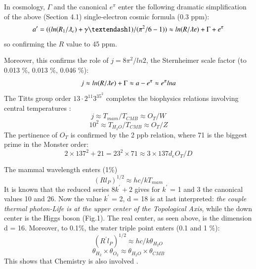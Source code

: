 \documentclass[twoside,draft]{article}
\begin{document}
\begin{sloppypar}
In cosmology, $\Gamma$ and the canonical $e^{\pi}$ enter the following dramatic simplification of the above (Section 4.1) single-electron cosmic formula (0.3 ppm):    
\begin{equation}
a^{\prime} = ((ln(R_1/\lambdabar_e) + \gamma – 1)/(\pi^2/6 - 1)) \approx ln(R/\lambdabar e) + \Gamma + e^{\pi}
\end{equation}
so confirming the $R$ value to 45 ppm.

Moreover, this confirms the role of $j = 8\pi^2/ln2$, the Sternheimer scale factor\cite{Sanchez1}  (to 0.013 \%, 0.013 \%, 0.046 \%):
\begin{equation}
j \approx ln(R/\lambdabar e) + \Gamma \approx a - e^{\pi} \approx e^{\pi} lna
\end{equation}
The Titts group order $13\cdot 2^{11}3^35^2$ \cite{Titts}  completes the biophysics relations involving central temperatures \cite{Sanchez1}: 
\begin{equation}
j\approx T_{mam}/T_{CMB} \approx O_T / W
\end{equation}
\begin{equation}
10^2\approx T_{H_2O}/T_{CMB} \approx O_T / Z
\end{equation}
The pertinence of $O_T$ is confirmed by the 2 ppb relation, where 71 is the biggest prime in the Monster order: 
\begin{equation}
2\times 137^2 + 21 = 23^2\times 71 \approx 3\times 137 d_e O_T/D    
\end{equation}


The mammal wavelength enters (1\%)
\begin{equation}
(Rl_P)^{1/2}\approx hc/kT_{mam}
\end{equation}
It is known that the reduced series $8k^{\prime}+2$ gives for $k^{\prime}$ = 1 and 3 the canonical values 10 and 26. Now the value $k^{\prime}$ = 2, d = 18 is at last interpreted: \textit{the couple thermal photon-Life is at the upper center of the Topological Axis}, while the down center is the Higgs boson (Fig.1). The real center, as seen above, is the dimension d = 16. Moreover, to 0.1\%, the water triple point enters (0.1 and 1 \%):
\begin{equation}
(R^{\prime}l_P)^{1/2}\approx hc/k\theta_{H_2O}
\end{equation}
\begin{equation}
\theta_{H_2}\times \theta_{O_2} \approx \theta_{H_2O} \times \theta_{CMB} 
\end{equation}
This shows that Chemistry is also involved \cite{Sanchez1}.


\end{sloppypar}
\end{document}
